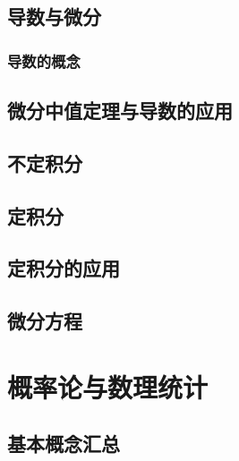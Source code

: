 \documentclass[11pt]{book}
\newcounter{#2}
\newcounter{#2}[#1]
\numberwithin{#2}{#1}
\begin{document}
	\chapter{导数与微分}
	\section{导数的概念}
	\chapter{微分中值定理与导数的应用}
	\chapter{不定积分}
	\chapter{定积分}
	\chapter{定积分的应用}
	\chapter{微分方程}
	

\part{概率论与数理统计}

	\chapter{基本概念汇总}
\end{document}
